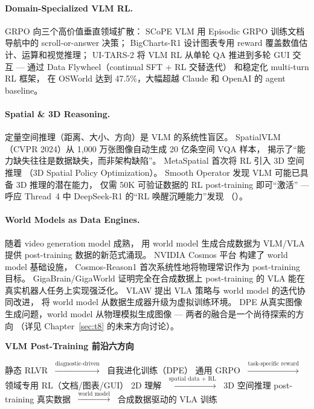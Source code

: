 \paragraph{Domain-Specialized VLM RL.}
\label{sec:t5-domain-rl}
GRPO 向三个高价值垂直领域扩散：
SCoPE VLM \cite{lim2025scopevlm} 用 Episodic GRPO 训练文档导航中的 scroll-or-answer 决策；
BigCharts-R1 \cite{masry2025bigchartsr1} 设计图表专用 reward 覆盖数值估计、运算和视觉推理；
UI-TARS-2 \cite{wang2025uitars2} 将 VLM RL 从单轮 QA 推进到多轮 GUI 交互 ---
通过 Data Flywheel（continual SFT + RL 交替迭代）
和稳定化 multi-turn RL 框架，
在 OSWorld 达到 47.5\%，大幅超越 Claude 和 OpenAI 的 agent baseline。

\paragraph{Spatial \& 3D Reasoning.}
\label{sec:t5-spatial-reasoning}
定量空间推理（距离、大小、方向）是 VLM 的系统性盲区。
SpatialVLM \cite{chen2024spatialvlm}（CVPR 2024）从 1,000 万张图像自动生成 20 亿条空间 VQA 样本，
揭示了``能力缺失往往是数据缺失，而非架构缺陷''。
MetaSpatial \cite{pan2025metaspatial} 首次将 RL 引入 3D 空间推理
（3D Spatial Policy Optimization）。
Smooth Operator \cite{jiao2026smoothoperator} 发现
VLM 可能已具备 3D 推理的潜在能力，
仅需 50K 可验证数据的 RL post-training 即可``激活'' ---
呼应 Thread~4 中 DeepSeek-R1 的``RL 唤醒沉睡能力''发现
（）。

\paragraph{World Models as Data Engines.}
\label{sec:t5-world-models}
随着 video generation model 成熟，
用 world model 生成合成数据为 VLM/VLA 提供 post-training 数据的新范式涌现。
NVIDIA Cosmos 平台 \cite{agarwal2025cosmoswfm,ali2025cosmospredict25} 构建了 world model 基础设施，
Cosmos-Reason1 \cite{azzolini2025cosmosreason1} 首次系统性地将物理常识作为 post-training 目标。
GigaBrain/GigaWorld \cite{ye2025gigabrain0,ye2025gigaworld0}
证明完全在合成数据上 post-training 的 VLA 能在真实机器人任务上实现强泛化。
VLAW \cite{guo2026vlaw} 提出 VLA 策略与 world model 的迭代协同改进，
将 world model 从数据生成器升级为虚拟训练环境。
DPE 从真实图像生成问题，world model 从物理模拟生成图像 ---
两者的融合是一个尚待探索的方向
（详见 Chapter~\ref{sec:t8} 的未来方向讨论）。

\begin{evolutionbox}
\textbf{VLM Post-Training 前沿六方向}

静态 RLVR $\;\xrightarrow{\text{diagnostic-driven}}\;$ 自我进化训练（DPE）
\qquad
通用 GRPO $\;\xrightarrow{\text{task-specific reward}}\;$ 领域专用 RL（文档/图表/GUI）
\qquad
2D 理解 $\;\xrightarrow{\text{spatial data + RL}}\;$ 3D 空间推理 post-training
\qquad
真实数据 $\;\xrightarrow{\text{world model}}\;$ 合成数据驱动的 VLA 训练
\end{evolutionbox}

